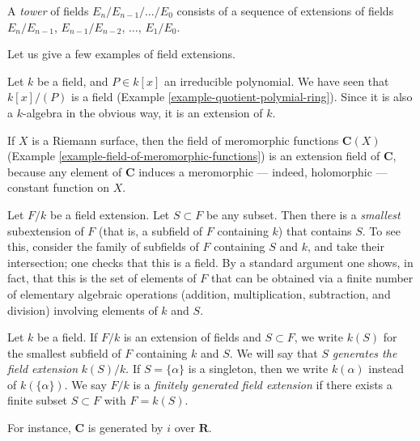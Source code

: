 \begin{definition}
\label{definition-tower}
A {\it tower} of fields $E_n/E_{n - 1}/\ldots/E_0$ consists of a sequence of
extensions of fields
$E_n/E_{n - 1}$, $E_{n - 1}/E_{n - 2}$, $\ldots$, $E_1/E_0$.
\end{definition}

\noindent
Let us give a few examples of field extensions.

\begin{example}
\label{example-monogenic-extension}
Let $k$ be a field, and $P \in k[x]$ an irreducible polynomial. We have
seen that $k[x]/(P)$ is a field (Example \ref{example-quotient-polymial-ring}).
Since it is also a $k$-algebra in the obvious way, it is an extension of $k$.
\end{example}

\begin{example}
\label{example-field-of-meromorphic-functions-extension-C}
If $X$ is a Riemann surface, then the field of meromorphic functions
$\mathbf{C}(X)$ (Example \ref{example-field-of-meromorphic-functions})
is an extension field of $\mathbf{C}$, because any element of $\mathbf{C}$
induces a meromorphic --- indeed, holomorphic --- constant function on $X$.
\end{example}

\noindent
Let $F/k$ be a field extension. Let $S \subset F$ be any subset.
Then there is a {\it smallest} subextension of $F$ (that is, a subfield of
$F$ containing $k$) that contains $S$. To see this, consider the family of
subfields of $F $ containing $S$ and $k$, and take their intersection; one
checks that this is a field. By a standard argument one shows, in fact, that
this is the set of elements of $F$ that can be obtained via a finite number
of elementary algebraic operations (addition, multiplication, subtraction,
and division) involving elements of $k$ and $S$.

\begin{definition}
\label{definition-generated-by}
Let $k$ be a field. If $F/k$ is an extension of fields and
$S \subset F$, we write $k(S)$ for the smallest subfield of $F$
containing $k$ and $S$. We will say that $S$ {\it generates the
field extension} $k(S)/k$. If $S = \{\alpha\}$ is a singleton, then we
write $k(\alpha)$ instead of $k(\{\alpha\})$. We say $F/k$ is a
{\it finitely generated field extension} if there exists a
finite subset $S \subset F$ with $F = k(S)$.
\end{definition}

\noindent
For instance, $\mathbf{C}$ is generated by $i$ over $\mathbf{R}$.

